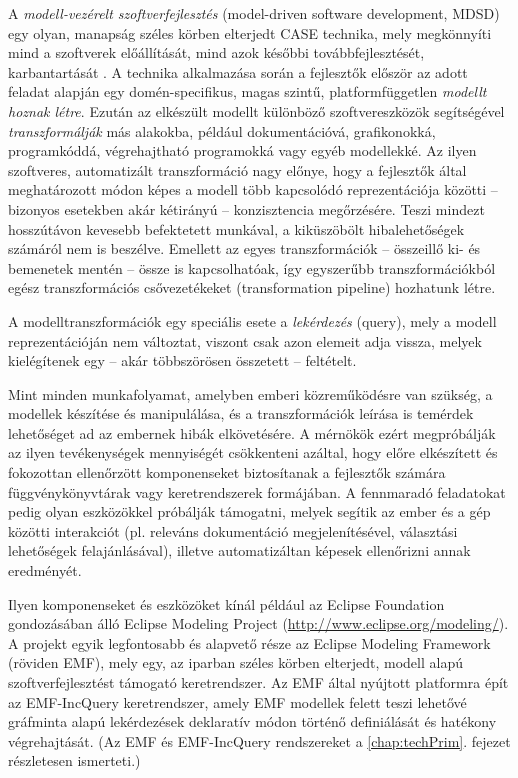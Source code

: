 A \emph{modell-vezérelt szoftverfejlesztés} (model-driven software development, \gls{MDSD}) egy olyan, manapság széles körben elterjedt \gls{CASE} technika, mely megkönnyíti mind a szoftverek előállítását, mind azok későbbi továbbfejlesztését, karbantartását \cite{MDSD:TEM06}.
A technika alkalmazása során a fejlesztők először az adott feladat alapján egy domén-specifikus, magas szintű, platformfüggetlen \emph{modellt hoznak létre}.
Ezután az elkészült modellt különböző szoftvereszközök segítségével \emph{transzformálják} más alakokba, például dokumentációvá, grafikonokká, programkóddá, végrehajtható programokká vagy egyéb modellekké.
Az ilyen szoftveres, automatizált transzformáció nagy előnye, hogy a fejlesztők által meghatározott módon képes a modell több kapcsolódó reprezentációja közötti -- bizonyos esetekben akár kétirányú -- konzisztencia megőrzésére.
Teszi mindezt hosszútávon kevesebb befektetett munkával, a kiküszöbölt hibalehetőségek számáról nem is beszélve.
Emellett az egyes transzformációk -- összeillő ki- és bemenetek mentén -- össze is kapcsolhatóak, így egyszerűbb transzformációkból egész transzformációs csővezetékeket (transformation pipeline) hozhatunk létre.

A modelltranszformációk egy speciális esete a \emph{lekérdezés} (query), mely a modell reprezentációján nem változtat, viszont csak azon elemeit adja vissza, melyek kielégítenek egy -- akár többszörösen összetett -- feltételt.

Mint minden munkafolyamat, amelyben emberi közreműködésre van szükség, a modellek készítése és manipulálása, és a transzformációk leírása is temérdek lehetőséget ad az embernek hibák elkövetésére.
A mérnökök ezért megpróbálják az ilyen tevékenységek mennyiségét csökkenteni azáltal, hogy előre elkészített és fokozottan ellenőrzött komponenseket biztosítanak a fejlesztők számára függvénykönyvtárak vagy keretrendszerek formájában.
A fennmaradó feladatokat pedig olyan eszközökkel próbálják támogatni, melyek segítik az ember és a gép közötti interakciót (pl. releváns dokumentáció megjelenítésével, választási lehetőségek felajánlásával), illetve automatizáltan képesek ellenőrizni annak eredményét.

Ilyen komponenseket és eszközöket kínál például az Eclipse Foundation gondozásában álló Eclipse Modeling Project (\url{http://www.eclipse.org/modeling/}).
A projekt egyik legfontosabb és alapvető része az Eclipse Modeling Framework (röviden \gls{EMF}), mely egy, az iparban széles körben elterjedt, modell alapú szoftverfejlesztést támogató keretrendszer.
Az \gls{EMF} által nyújtott platformra épít az EMF-IncQuery keretrendszer, amely \gls{EMF} modellek felett teszi lehetővé gráfminta alapú lekérdezések deklaratív módon történő definiálását és hatékony végrehajtását.
(Az \gls{EMF} és EMF-IncQuery rendszereket a \ref{chap:techPrim}. fejezet részletesen ismerteti.)

